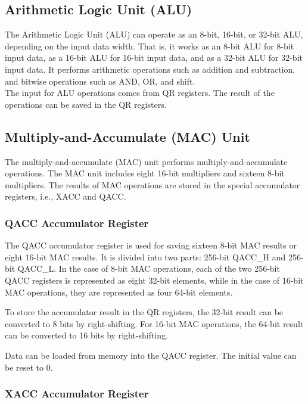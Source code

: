 \documentclass[main\_\_EN.tex]{subfiles}
\begin{document}
\subsection{Arithmetic Logic Unit (ALU)}

The Arithmetic Logic Unit (ALU) can operate as an 8-bit, 16-bit, or 32-bit ALU, depending on the input data width. That is, it works as an 8-bit ALU for 8-bit input data, as a 16-bit ALU for 16-bit input data, and as a 32-bit ALU for 32-bit input data. It performs arithmetic operations such as addition and subtraction, and bitwise operations such as AND, OR, and shift.\\
The input for ALU operations comes from QR registers. The result of the operations can be saved in the QR registers.

\subsection{Multiply-and-Accumulate (MAC) Unit}
The multiply-and-accumulate (MAC) unit performs multiply-and-accumulate operations. The MAC unit includes eight 16-bit multipliers and sixteen 8-bit multipliers. The results of MAC operations are stored in the special accumulator registers, i.e., XACC and QACC.

\subsubsection{QACC Accumulator Register}

The QACC accumulator register is used for saving sixteen 8-bit MAC results or eight 16-bit MAC results. It is divided into two parts: 256-bit QACC\_H and 256-bit QACC\_L. In the case of 8-bit MAC operations, each of the two 256-bit QACC registers is represented as eight 32-bit elements, while in the case of 16-bit MAC operations, they are represented as four 64-bit elements.

To store the accumulator result in the QR registers, the 32-bit result can be converted to 8 bits by right-shifting. For 16-bit MAC operations, the 64-bit result can be converted to 16 bits by right-shifting.

Data can be loaded from memory into the QACC register. The initial value can be reset to 0.

\subsubsection{XACC Accumulator Register}
\end{document}
